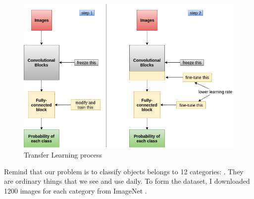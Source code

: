 \begin{figure}[tb]
	\centering
	\includegraphics[width=0.9\hsize]{./figures/transferLearning}
	\caption{Transfer Learning process}
	\label{fig:transferLearning}
\end{figure}

Remind that our problem is to classify objects belongs to 12 categories: . They are ordinary things that we see and use daily. To form the dataset, I downloaded 1200 images for each category from ImageNet \cite{imagenet_cvpr09}.

